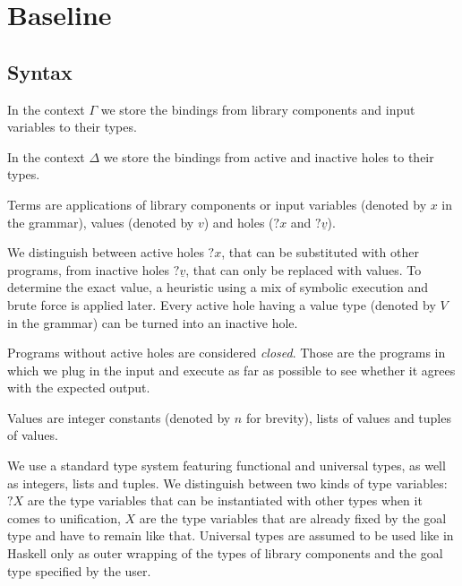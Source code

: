 \chapter{Baseline} \label{baseline}

\section{Syntax}

In the context $\Gamma$ we store the bindings from library components and input variables to their types.

In the context $\Delta$ we store the bindings from active and inactive holes to their types.

Terms are applications of library components or input variables (denoted by $x$ in the grammar), values (denoted by $v$) and holes ($?x$ and $?\underline{v}$).

We distinguish between active holes $?x$, that can be substituted with other programs, from inactive holes $?\underline{v}$, that can only be replaced with values. To determine the exact value, a heuristic using a mix of symbolic execution and brute force is applied later. Every active hole having a value type (denoted by $V$ in the grammar) can be turned into an inactive hole.

Programs without active holes are considered \emph{closed}. Those are the programs in which we plug in the input and execute as far as possible to see whether it agrees with the expected output.

Values are integer constants (denoted by $n$ for brevity), lists of values and tuples of values. 

We use a standard type system featuring functional and universal types, as well as integers, lists and tuples. We distinguish between two kinds of type variables: $?X$ are the type variables that can be instantiated with other types when it comes to unification, $X$ are the type variables that are already fixed by the goal type and have to remain like that. Universal types are assumed to be used like in Haskell only as outer wrapping of the types of library components and the goal type specified by the user.

